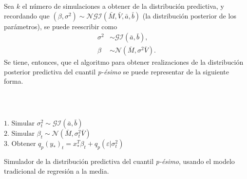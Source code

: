Sea $k$ el n\'umero de simulaciones a obtener de la distribuci\'on predictiva, y recordando que $(\beta,\sigma^2) \sim \mathcal{NGI}(\bar{M},\bar{V},\bar{a},\bar{b})$ (la distribuci\'on posterior de los par\'ametros), se puede reescribir como
\begin{equation*}
\begin{aligned}
    \sigma^2 &\sim \mathcal{GI}(\bar{a},\bar{b}), \\
    \beta &\sim \mathcal{N}(\bar{M},\sigma^2 \bar{V}).
\end{aligned}
\end{equation*}
Se tiene, entonces, que el algoritmo para obtener realizaciones de la distribuci\'on posterior predictiva del cuantil \textit{p-\'esimo} se puede representar de la siguiente forma.


\\ \\
\begin{algorithm}[H]
 {
     {
        $1. \text{ Simular } \sigma^2_t \sim \mathcal{GI}(\bar{a},\bar{b})\;$\\
        $2. \text{ Simular } \beta_t \sim \mathcal{N}(\bar{M},\sigma^2_t \bar{V})\;$\\
        $3. \text{ Obtener } q_p(y_*)_t = x_*^T\beta_t + q_p(\varepsilon|\sigma^2_t) \;$
     }
 }
 \caption{Simulador de la distribuci\'on predictiva del cuantil \textit{p-\'esimo}, usando el modelo tradicional de regresi\'on a la media.}
\end{algorithm}
\BlankLine

\newpage